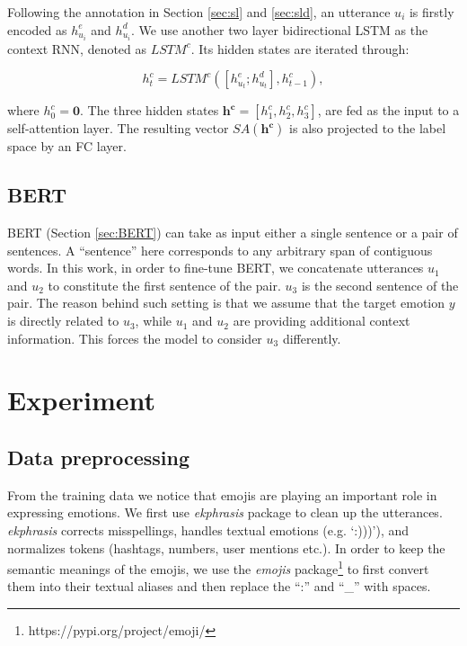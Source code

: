 \documentclass[11pt,a4paper]{article}
\begin{document}
Following the annotation in Section \ref{sec:sl} and \ref{sec:sld}, an utterance $u_i$ is firstly encoded as $h^{e}_{u_i}$ and $h^{d}_{u_i}$. We use another two layer bidirectional LSTM as the context RNN, denoted as $LSTM^c$. Its hidden states are iterated through:

\begin{equation}
    h^{c}_{t}  = LSTM^c([h^{e}_{u_t}; h^{d}_{u_t}], h^{c}_{t-1}),
\end{equation}

where $h^{c}_{0} = \bm{0}$. The three hidden states $\bm{h^{c}} = [h^{c}_1, h^{c}_2, h^{c}_3]$, are fed as the input to a self-attention layer. The resulting vector $SA(\bm{h^{c}})$ is also projected to the label space by an FC layer.

\subsection{BERT} 
BERT (Section \ref{sec:BERT}) can take as input either a single sentence or a pair of sentences. A ``sentence'' here corresponds to any arbitrary span of contiguous words.
In this work, in order to fine-tune 
BERT, 
we concatenate utterances $u_1$ and $u_2$ to constitute 
the first sentence of the pair.
$u_3$ 
is 
the second sentence of the pair.
The reason behind such setting is that we assume that the target emotion 
$y$ is directly related to $u_3$, while $u_1$ and $u_2$ are providing additional context information. 
This forces the model to consider $u_3$ differently. 

\section{Experiment}

\subsection{Data preprocessing}
From the training data we notice that emojis are playing an important role in expressing emotions. We first use \emph{ekphrasis} package  \cite{baziotis-pelekis-doulkeridis:2017:SemEval2} to clean up the utterances. \emph{ekphrasis} corrects misspellings, handles textual emotions (e.g. `:)))'), and normalizes tokens (hashtags, numbers, user mentions etc.). In order to keep the semantic meanings of the emojis, we use the \emph{emojis} package\footnote{https://pypi.org/project/emoji/} to first convert them into their textual aliases and then replace the ``:'' and ``\_'' with spaces. 
\end{document}
